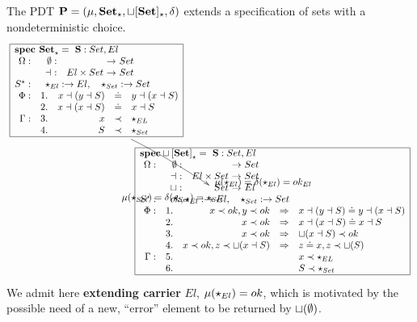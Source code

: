 \begin{example}
The PDT ${\bf P}=(\mu,{\bf Set}_\star,{\bf \sqcup[Set]_\star},\delta)$ 
extends a specification of sets with a nondeterministic
choice.
%
\[%
\xymatrix{
\frame{\txt{$\spec{
\tit{\mbox{\bf spec\ Set}_\cons^{{}}=\ \Sorts: Set,El} \\
	\spOps{\Ops}{
	\emptyset: && Set \\
	\prep\ : & El\times Set & Set 
	}
	\spOps{\allcons}{ \cons_{El}: \to El,\ \ \  \cons_{Set}:\to Set}
	\Phi: & 1.& x\prep (y\prep S) & \eleq & y\prep (x\prep S) \\
	      & 2.& x\prep (x\prep S) & \eleq & x\prep S \\
	\Gamma:
	   &3. & x &\prec &\cons_{EL} \\ 
	   &4. & S &\prec &\cons_{Set}
}$}}
\ar@(u,r)[dr]^{\txt{\normalsize{\hspace*{1.5em}$\mu(\cons_{El})=\delta(\cons_{El})=ok_{El}$}}}_{\txt{\normalsize${\mu(\cons_{Set})=\delta(\cons_{Set})=
	\cons_{Set}\ \ \ }$}} 
\\ &
\hspace*{-8em}\frame{\txt{$\spec{
\tit{\thr{spec \choice[Set]}_\cons=\ \Sorts: Set, El} \\
	\spOps{\Ops}{
	\emptyset: && Set \\
	\prep\ : & El\times Set & Set \\
	\choice : & Set & El
	}
	\spOps{\allcons}{ ok,\cons_{El}: \to El,\ \ \  \cons_{Set}:\to Set}
	\Phi: & 1.& x\prec ok,y\prec ok &\To & x\prep (y\prep S)  \eleq  y\prep (x\prep S) \\
	      & 2.& x\prec ok & \To & x\prep (x\prep S)  \eleq  x\prep S \\
	      & 3.& x\prec ok & \To & \choice(x\prep S)\prec ok \\
	      & 4.& x\prec ok, z\prec \choice(x\prep S) 
	            & \To & z\eleq x, z\prec \choice(S)\\
	\Gamma:
   	    &5. &&& x \prec \cons_{EL} \\ 
	    &6. &&& S\prec \cons_{Set}
}$}}
}%
\]
%
We admit here {\bf extending carrier} $El$, $\mu(\star_{El})=ok$, which is
motivated by the possible need of a new, ``error'' element to be returned by
 $\sqcup(\emptyset)$.


\end{example}
